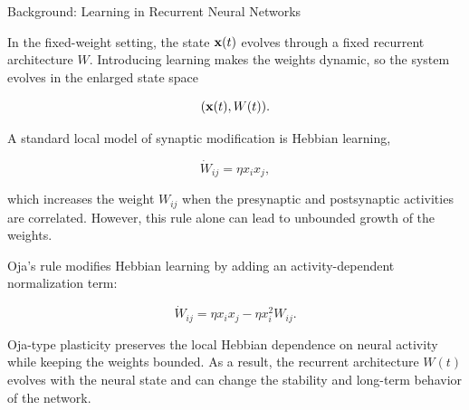 \documentclass[
11pt,notheorems,hyperref={pdfauthor=whatever}
]{beamer}
\begin{document}
\begin{frame}{Background: Learning in Recurrent Neural Networks}
\small

In the fixed-weight setting, the state \({\bf x}(t)\) evolves through a fixed recurrent
architecture \(W\). Introducing learning makes the weights dynamic, so the
system evolves in the enlarged state space

\[
({\bf x}(t),W(t)).
\]

\vspace{0.5em}

A standard local model of synaptic modification is Hebbian learning,

\[
\dot W_{ij}
=
\eta x_i x_j,
\]

which increases the weight \(W_{ij}\) when the presynaptic and postsynaptic
activities are correlated. However, this rule alone can lead to unbounded
growth of the weights.

\vspace{0.5em}

Oja's rule modifies Hebbian learning by adding an activity-dependent
normalization term:

\[
\dot W_{ij}
=
\eta x_i x_j
-
\eta x_i^2 W_{ij}.
\]

\vspace{0.4em}

Oja-type plasticity preserves the local Hebbian dependence on neural activity
while keeping the weights bounded. As a result, the recurrent architecture
\(W(t)\) evolves with the neural state and can change the stability and
long-term behavior of the network.

\end{frame}
\end{document}
